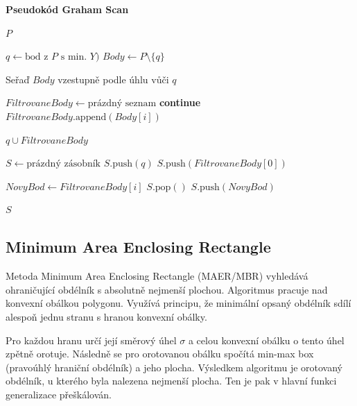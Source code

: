 \newpage
\textbf{Pseudokód Graham Scan}
\begin{algorithm}[H]
\caption{Graham Scan (P)}
\label{alg:graham}
\begin{algorithmic}[1]
        \State \Return $P$ 
    \EndIf
    
    \State $q \gets \text{bod z } P \text{ s min. } Y \text{)}$
    \State $Body \gets P \setminus \{q\}$
    
    \State Seřaď $Body$ vzestupně podle  úhlu vůči $q$
    \
    
    \State $FiltrovaneBody \gets \text{prázdný seznam}$
            \State \textbf{continue} 
        \EndIf
        \State $FiltrovaneBody.\text{append}(Body[i])$
    \EndFor
    
        \State \Return $q \cup FiltrovaneBody$
    \EndIf
    
    \State $S \gets \text{prázdný zásobník}$
    \State $S.\text{push}(q)$
    \State $S.\text{push}(FiltrovaneBody[0])$
    
        \State $NovyBod \gets FiltrovaneBody[i]$
            \State $S.\text{pop}()$ 
        \EndWhile
        \State $S.\text{push}(NovyBod)$
    \EndFor
    
    \State \Return $S$
\end{algorithmic}
\end{algorithm}
\subsection{Minimum Area Enclosing Rectangle}

Metoda Minimum Area Enclosing Rectangle (MAER/MBR) vyhledává ohraničující obdélník s absolutně nejmenší plochou. Algoritmus pracuje nad konvexní obálkou polygonu. Využívá principu, že minimální opsaný obdélník sdílí alespoň jednu stranu s hranou konvexní obálky. 

Pro každou hranu určí její směrový úhel $\sigma$ a celou konvexní obálku o tento úhel zpětně orotuje. Následně se pro orotovanou obálku spočítá min-max box (pravoúhlý hraniční obdélník) a jeho plocha. Výsledkem algoritmu je orotovaný obdélník, u kterého byla nalezena nejmenší plocha. Ten je pak v hlavní funkci generalizace přeškálován.
\\[2mm]

